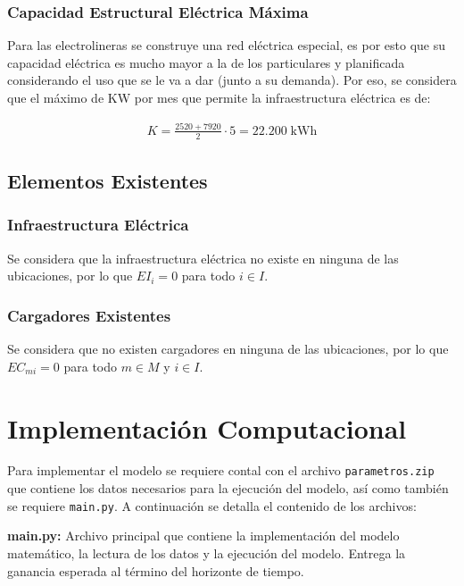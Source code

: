 \documentclass[letterpaper]{article}
\begin{document}
\begin{flushleft}
	\subsubsection{Capacidad Estructural Eléctrica Máxima}

	Para las electrolineras se construye una red eléctrica especial, es por esto que su capacidad eléctrica es mucho mayor a la de los particulares y planificada considerando el uso que se le va a dar (junto a su demanda). Por eso, se considera que el máximo de KW por mes que permite la infraestructura eléctrica es de:

	\begin{align*}
		K = \frac{2520 + 7920}{2} \cdot 5= 22.200 \; \text{kWh}
	\end{align*}

	\subsection{Elementos Existentes}

	\subsubsection{Infraestructura Eléctrica}

	Se considera que la infraestructura eléctrica no existe en ninguna de las ubicaciones, por lo que $EI_i = 0$ para todo $i \in I$.

	\subsubsection{Cargadores Existentes}

	Se considera que no existen cargadores en ninguna de las ubicaciones, por lo que $EC_{mi} = 0$ para todo $m \in M$ y $i \in I$.

	\section{Implementación Computacional}

	Para implementar el modelo se requiere contal con el archivo \texttt{parametros.zip} que contiene los datos necesarios para la ejecución del modelo, así como también se requiere \texttt{main.py}. A continuación se detalla el contenido de los archivos:

	\textbf{main.py:} Archivo principal que contiene la implementación del modelo matemático, la lectura de los datos y la ejecución del modelo. Entrega la ganancia esperada al término del horizonte de tiempo.


\end{flushleft}
\end{document}
